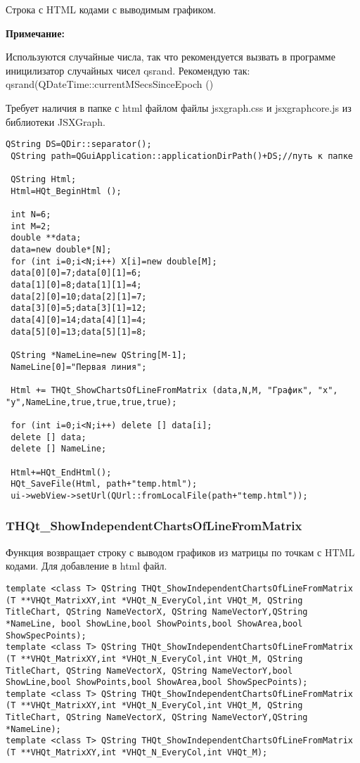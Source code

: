 \documentclass[a4paper,12pt]{article}
\begin{document}
Строка с HTML кодами с выводимым графиком.

\textbf{Примечание:}

Используются случайные числа, так что рекомендуется вызвать в программе иницилизатор случайных чисел qsrand. Рекомендую так: qsrand(QDateTime::currentMSecsSinceEpoch () %

Требует наличия в папке с html файлом файлы jsxgraph.css и jsxgraphcore.js из библиотеки JSXGraph.


\begin{lstlisting}[label=code_use_THQt_ShowChartsOfLineFromMatrix,caption=Пример использования]
QString DS=QDir::separator();
 QString path=QGuiApplication::applicationDirPath()+DS;//путь к папке

 QString Html;
 Html=HQt_BeginHtml ();

 int N=6;
 int M=2;
 double **data;
 data=new double*[N];
 for (int i=0;i<N;i++) X[i]=new double[M];
 data[0][0]=7;data[0][1]=6;
 data[1][0]=8;data[1][1]=4;
 data[2][0]=10;data[2][1]=7;
 data[3][0]=5;data[3][1]=12;
 data[4][0]=14;data[4][1]=4;
 data[5][0]=13;data[5][1]=8;

 QString *NameLine=new QString[M-1];
 NameLine[0]="Первая линия";

 Html += THQt_ShowChartsOfLineFromMatrix (data,N,M, "График", "x", "y",NameLine,true,true,true,true);

 for (int i=0;i<N;i++) delete [] data[i];
 delete [] data;
 delete [] NameLine;

 Html+=HQt_EndHtml();
 HQt_SaveFile(Html, path+"temp.html");
 ui->webView->setUrl(QUrl::fromLocalFile(path+"temp.html"));
\end{lstlisting}

\subsubsection{THQt\_ShowIndependentChartsOfLineFromMatrix}\label{THQt_ShowIndependentChartsOfLineFromMatrix}

Функция возвращает строку с выводом графиков из матрицы по точкам с HTML кодами. Для добавление в html файл.


\begin{lstlisting}[label=code_syntax_THQt_ShowIndependentChartsOfLineFromMatrix,caption=Синтаксис]
template <class T> QString THQt_ShowIndependentChartsOfLineFromMatrix (T **VHQt_MatrixXY,int *VHQt_N_EveryCol,int VHQt_M, QString TitleChart, QString NameVectorX, QString NameVectorY,QString *NameLine, bool ShowLine,bool ShowPoints,bool ShowArea,bool ShowSpecPoints);
template <class T> QString THQt_ShowIndependentChartsOfLineFromMatrix (T **VHQt_MatrixXY,int *VHQt_N_EveryCol,int VHQt_M, QString TitleChart, QString NameVectorX, QString NameVectorY,bool ShowLine,bool ShowPoints,bool ShowArea,bool ShowSpecPoints);
template <class T> QString THQt_ShowIndependentChartsOfLineFromMatrix (T **VHQt_MatrixXY,int *VHQt_N_EveryCol,int VHQt_M, QString TitleChart, QString NameVectorX, QString NameVectorY,QString *NameLine);
template <class T> QString THQt_ShowIndependentChartsOfLineFromMatrix (T **VHQt_MatrixXY,int *VHQt_N_EveryCol,int VHQt_M);
\end{lstlisting}
\end{document}
